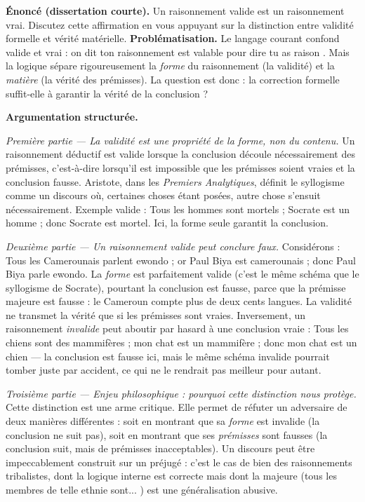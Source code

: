 \documentclass[11pt]{article}
\begin{document}
\begin{exoresolu}
\textbf{Énoncé (dissertation courte).} \guillemotleft Un raisonnement valide est un raisonnement vrai. \guillemotright Discutez cette affirmation en vous appuyant sur la distinction entre validité formelle et vérité matérielle.
\tcblower
\textbf{Problématisation.} Le langage courant confond \guillemotleft valide \guillemotright et \guillemotleft vrai \guillemotright : on dit \guillemotleft ton raisonnement est valable \guillemotright pour dire \guillemotleft tu as raison \guillemotright. Mais la logique sépare rigoureusement la \emph{forme} du raisonnement (la validité) et la \emph{matière} (la vérité des prémisses). La question est donc : la correction formelle suffit-elle à garantir la vérité de la conclusion ?

\textbf{Argumentation structurée.}

\emph{Première partie — La validité est une propriété de la forme, non du contenu.} Un raisonnement déductif est valide lorsque la conclusion découle nécessairement des prémisses, c'est-à-dire lorsqu'il est impossible que les prémisses soient vraies et la conclusion fausse. Aristote, dans les \emph{Premiers Analytiques}, définit le syllogisme comme un discours où, certaines choses étant posées, autre chose s'ensuit nécessairement. Exemple valide : \guillemotleft Tous les hommes sont mortels ; Socrate est un homme ; donc Socrate est mortel. \guillemotright Ici, la forme seule garantit la conclusion.

\emph{Deuxième partie — Un raisonnement valide peut conclure faux.} Considérons : \guillemotleft Tous les Camerounais parlent ewondo ; or Paul Biya est camerounais ; donc Paul Biya parle ewondo. \guillemotright La \emph{forme} est parfaitement valide (c'est le même schéma que le syllogisme de Socrate), pourtant la conclusion est fausse, parce que la prémisse majeure est fausse : le Cameroun compte plus de deux cents langues. La validité ne transmet la vérité que si les prémisses sont vraies. Inversement, un raisonnement \emph{invalide} peut aboutir par hasard à une conclusion vraie : \guillemotleft Tous les chiens sont des mammifères ; mon chat est un mammifère ; donc mon chat est un chien \guillemotright — la conclusion est fausse ici, mais le même schéma invalide pourrait tomber juste par accident, ce qui ne le rendrait pas meilleur pour autant.

\emph{Troisième partie — Enjeu philosophique : pourquoi cette distinction nous protège.} Cette distinction est une arme critique. Elle permet de réfuter un adversaire de deux manières différentes : soit en montrant que sa \emph{forme} est invalide (la conclusion ne suit pas), soit en montrant que ses \emph{prémisses} sont fausses (la conclusion suit, mais de prémisses inacceptables). Un discours peut être impeccablement construit sur un préjugé : c'est le cas de bien des raisonnements tribalistes, dont la logique interne est correcte mais dont la majeure (\guillemotleft tous les membres de telle ethnie sont... \guillemotright) est une généralisation abusive.


\end{exoresolu}
\end{document}
